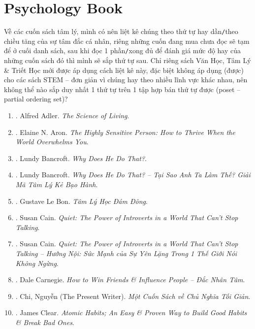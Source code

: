 \documentclass{article}
\begin{document}
\section{Psychology Book}
Về các cuốn sách tâm lý, mình có nên liệt kê chúng theo thứ tự hay dần\texttt{/}theo chiều tăng của sự tâm đắc cá nhân, riêng những cuốn đang mua chưa đọc sẽ tạm để ở cuối danh sách, sau khi đọc 1 phần\texttt{/}xong đủ để đánh giá mức độ hay của những cuốn sách đó thì mình sẽ sắp thứ tự sau. Chỉ riêng sách Văn Học, Tâm Lý \& Triết Học mới được áp dụng cách liệt kê này, đặc biệt không áp dụng (được) cho các sách STEM -- đơn giản vì chúng hay theo nhiều lĩnh vực khác nhau, nên không thể nào sắp duy nhất 1 thứ tự trên 1 tập hợp bán thứ tự được (poset -- partial ordering set)?
\begin{enumerate}
	\item \cite{Adler2013}. Alfred Adler. \textit{The Science of Living}.\hfill{}
	\item \cite{Aron2013}. Elaine N. Aron. \textit{The Highly Sensitive Person: How to Thrive When the World Overwhelms You}.\\\mbox{}\hfill{}
	\item \cite{Bancroft2003}. Lundy Bancroft. \textit{Why Does He Do That?}.\hfill{\sf[downloaded]}
	\item \cite{Bancroft2019}. Lundy Bancroft. \textit{Why Does He Do That? -- Tại Sao Anh Ta Làm Thế? Giải Mã Tâm Lý Kẻ Bạo Hành}.\\\mbox{}\hfill{}
	\item \cite{Bon2022}. Gustave Le Bon. \textit{Tâm Lý Học Đám Đông}.\hfill{}
	\item \cite{Cain2013}. Susan Cain. \textit{Quiet: The Power of Introverts in a World That Can't Stop Talking}.\hfill{}
	\item \cite{Cain2022}. Susan Cain. \textit{Quiet: The Power of Introverts in a World That Can't Stop Talking -- Hướng Nội: Sức Mạnh của Sự Yên Lặng Trong 1 Thế Giới Nói Không Ngừng}.\hfill{}
	\item \cite{Carnegie2021}. Dale Carnegie. \textit{How to Win Friends \& Influence People -- Đắc Nhân Tâm}.\hfill{}
	\item \cite{Chi2022}. Chi, Nguyễn (The Present Writer). \textit{Một Cuốn Sách về Chủ Nghĩa Tối Giản}. \hfill{}
	\item \cite{Clear2018}. James Clear. \textit{Atomic Habits; An Easy \& Proven Way to Build Good Habits \& Break Bad Ones}.\hfill{\sf[downloaded]}

\end{enumerate}
\end{document}

